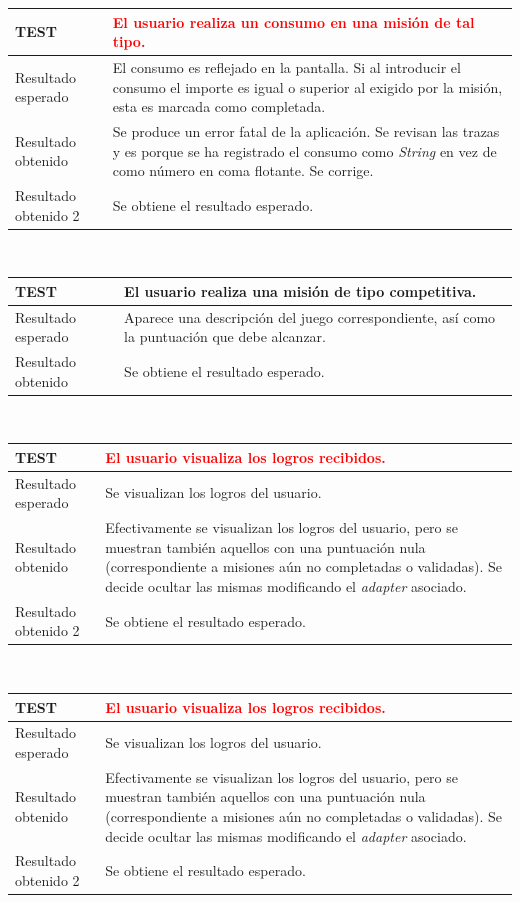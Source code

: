 \documentclass[twoside]{report}
\newcommand\addrow[2]{#1 &#2\\ }
\newcommand\addheading[2]{#1 &#2\\ \hline}
\newcommand\tabularhead{\begin{tabular}{lp{0.7\textwidth}}
\hline
}
\newenvironment{test}{\tabularhead}
{\hline\end{tabular}}
\begin{document}
\begin{test}
  \addheading{\textbf{TEST\arabic{test}}}{\textcolor{red}{El usuario realiza un consumo en una misión de tal tipo.}} 
  \addrow{Resultado esperado}{El consumo es reflejado en la pantalla. Si al introducir el consumo el importe es igual o superior al exigido por la misión, esta es marcada como completada.}
  \addrow{Resultado obtenido}{Se produce un error fatal de la aplicación. Se revisan las trazas y es porque se ha registrado el consumo como \textit{String} en vez de como número en coma flotante. Se corrige.}
   \addrow{Resultado obtenido 2}{Se obtiene el resultado esperado.}
\end{test}\\

\vspace{0.5cm}

\begin{test}
  \addheading{\textbf{TEST\arabic{test}}}{El usuario realiza una misión de tipo competitiva.} 
  \addrow{Resultado esperado}{Aparece una descripción del juego correspondiente, así como la puntuación que debe alcanzar.}
  \addrow{Resultado obtenido}{Se obtiene el resultado esperado.}
\end{test}\\

\vspace{0.5cm}

\begin{test}
  \addheading{\textbf{TEST\arabic{test}}}{\textcolor{red}{El usuario visualiza los logros recibidos.}}
  \addrow{Resultado esperado}{Se visualizan los logros del usuario.}
  \addrow{Resultado obtenido}{Efectivamente se visualizan los logros del usuario, pero se muestran también aquellos con una puntuación nula (correspondiente a misiones aún no completadas o validadas). Se decide ocultar las mismas modificando el \textit{adapter} asociado.}
   \addrow{Resultado obtenido 2}{Se obtiene el resultado esperado.}
\end{test}\\

\vspace{0.5cm}

\begin{test}
  \addheading{\textbf{TEST\arabic{test}}}{\textcolor{red}{El usuario visualiza los logros recibidos.}}
  \addrow{Resultado esperado}{Se visualizan los logros del usuario.}
  \addrow{Resultado obtenido}{Efectivamente se visualizan los logros del usuario, pero se muestran también aquellos con una puntuación nula (correspondiente a misiones aún no completadas o validadas). Se decide ocultar las mismas modificando el \textit{adapter} asociado.}
   \addrow{Resultado obtenido 2}{Se obtiene el resultado esperado.}
\end{test}\\
\end{document}
